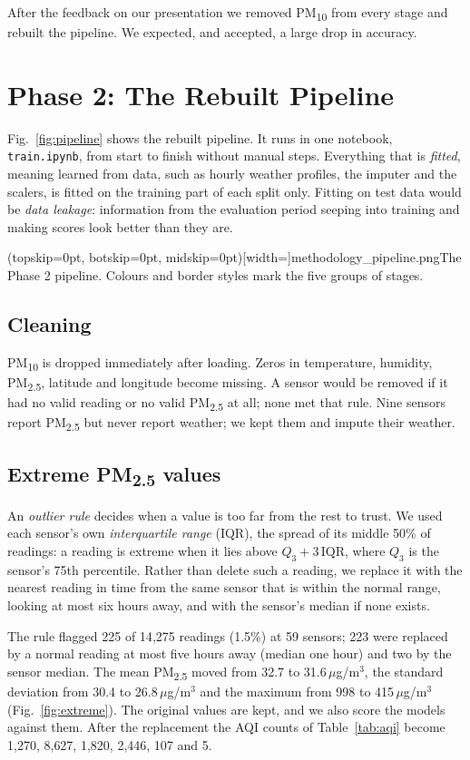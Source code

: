 \documentclass{ieeeaccess}
\newcommand{\ugm}{\,$\mu$g/m$^{3}$}
\newcommand{\pmtwo}{PM\textsubscript{2.5}}
\newcommand{\pmten}{PM\textsubscript{10}}
\begin{document}
After the feedback on our presentation we removed \pmten{} from every stage and rebuilt the pipeline. We expected, and accepted, a large drop in accuracy.

\section{Phase 2: The Rebuilt Pipeline}
\label{sec:phase2}

Fig.~\ref{fig:pipeline} shows the rebuilt pipeline. It runs in one notebook, \texttt{train.ipynb}, from start to finish without manual steps. Everything that is \emph{fitted}, meaning learned from data, such as hourly weather profiles, the imputer and the scalers, is fitted on the training part of each split only. Fitting on test data would be \emph{data leakage}: information from the evaluation period seeping into training and making scores look better than they are.

\Figure[t!](topskip=0pt, botskip=0pt, midskip=0pt)[width=\textwidth]{methodology_pipeline.png}{The Phase 2 pipeline. Colours and border styles mark the five groups of stages.\label{fig:pipeline}}

\subsection{Cleaning}
\pmten{} is dropped immediately after loading. Zeros in temperature, humidity, \pmtwo{}, latitude and longitude become missing. A sensor would be removed if it had no valid reading or no valid \pmtwo{} at all; none met that rule. Nine sensors report \pmtwo{} but never report weather; we kept them and impute their weather.

\subsection{Extreme \pmtwo{} values}
\label{sec:extreme}
An \emph{outlier rule} decides when a value is too far from the rest to trust. We used each sensor's own \emph{interquartile range} (IQR), the spread of its middle 50\% of readings: a reading is extreme when it lies above $Q_3 + 3\,\mathrm{IQR}$, where $Q_3$ is the sensor's 75th percentile. Rather than delete such a reading, we replace it with the nearest reading in time from the same sensor that is within the normal range, looking at most six hours away, and with the sensor's median if none exists.

The rule flagged 225 of 14{,}275 readings (1.5\%) at 59 sensors; 223 were replaced by a normal reading at most five hours away (median one hour) and two by the sensor median. The mean \pmtwo{} moved from 32.7 to 31.6\ugm{}, the standard deviation from 30.4 to 26.8\ugm{} and the maximum from 998 to 415\ugm{} (Fig.~\ref{fig:extreme}). The original values are kept, and we also score the models against them. After the replacement the AQI counts of Table~\ref{tab:aqi} become 1{,}270, 8{,}627, 1{,}820, 2{,}446, 107 and 5.
\end{document}
